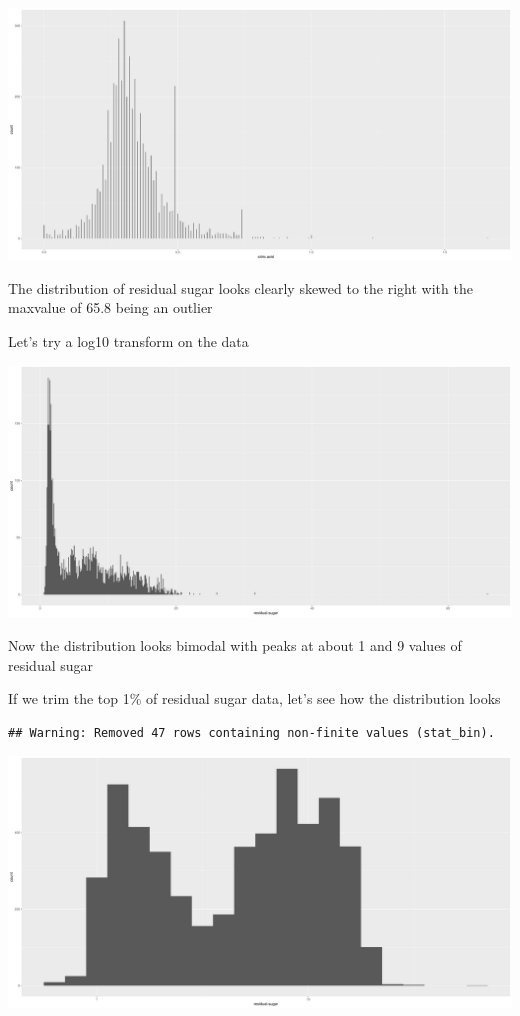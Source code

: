 \documentclass[]{article}
\begin{document}
\includegraphics{White_wine_quality_files/figure-latex/unnamed-chunk-9-1.pdf}

The distribution of residual sugar looks clearly skewed to the right
with the maxvalue of 65.8 being an outlier

Let's try a log10 transform on the data

\includegraphics{White_wine_quality_files/figure-latex/unnamed-chunk-10-1.pdf}

Now the distribution looks bimodal with peaks at about 1 and 9 values of
residual sugar

If we trim the top 1\% of residual sugar data, let's see how the
distribution looks

\begin{verbatim}
## Warning: Removed 47 rows containing non-finite values (stat_bin).
\end{verbatim}

\includegraphics{White_wine_quality_files/figure-latex/unnamed-chunk-11-1.pdf}
\end{document}
